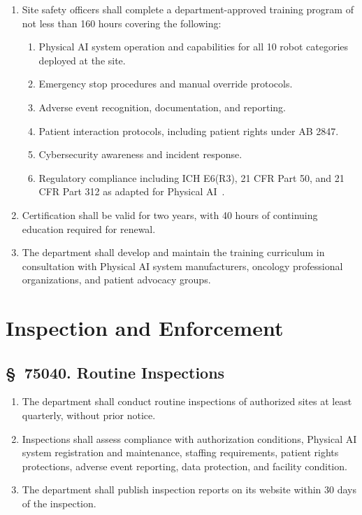 \documentclass[11pt,letterpaper]{article}
\begin{document}
\begin{enumerate}[label=(\alph*)]
\item Site safety officers shall complete a department-approved training program
  of not less than 160 hours covering the following:
  \begin{enumerate}[label=(\arabic*)]
  \item Physical AI system operation and capabilities for all 10 robot
    categories deployed at the site.
  \item Emergency stop procedures and manual override protocols.
  \item Adverse event recognition, documentation, and reporting.
  \item Patient interaction protocols, including patient rights under AB 2847.
  \item Cybersecurity awareness and incident response.
  \item Regulatory compliance including ICH E6(R3), 21 CFR Part 50, and
    21 CFR Part 312 as adapted for Physical AI~\cite{iche6r3adapt,cfr50adapt,cfr312adapt}.
  \end{enumerate}

\item Certification shall be valid for two years, with 40 hours of continuing
  education required for renewal.

\item The department shall develop and maintain the training curriculum in
  consultation with Physical AI system manufacturers, oncology professional
  organizations, and patient advocacy groups.
\end{enumerate}

\section{Inspection and Enforcement}

\subsection{\S~75040. Routine Inspections}

\begin{enumerate}[label=(\alph*)]
\item The department shall conduct routine inspections of authorized sites at
  least quarterly, without prior notice.

\item Inspections shall assess compliance with authorization conditions,
  Physical AI system registration and maintenance, staffing requirements,
  patient rights protections, adverse event reporting, data protection, and
  facility condition.

\item The department shall publish inspection reports on its website within 30
  days of the inspection.
\end{enumerate}
\end{document}
